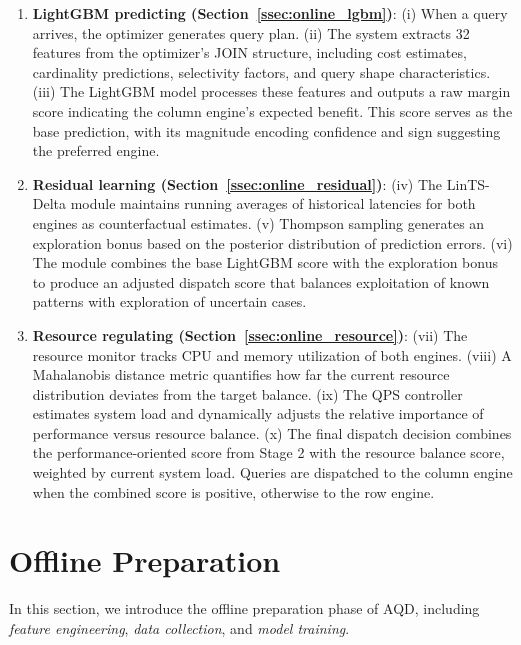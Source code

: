 \documentclass[sigconf, nonacm]{acmart}
\newcommand{\dispatcher}{AQD\xspace}
\begin{document}
\begin{enumerate}[leftmargin=*]
  \item \textbf{LightGBM predicting (Section~\ref{ssec:online_lgbm})}: 
        (i) When a query arrives, the optimizer generates query plan.
        (ii) The system extracts 32 features from the optimizer's JOIN structure, including cost estimates, cardinality predictions, selectivity factors, and query shape characteristics.
        (iii) The LightGBM model processes these features and outputs a raw margin score indicating the column engine's expected benefit. This score serves as the base prediction, with its magnitude encoding confidence and sign suggesting the preferred engine.

    \item \textbf{Residual learning (Section~\ref{ssec:online_residual})}:  
        (iv) The LinTS-Delta module maintains running averages of historical latencies for both engines as counterfactual estimates.
        (v) Thompson sampling generates an exploration bonus based on the posterior distribution of prediction errors.
        (vi) The module combines the base LightGBM score with the exploration bonus to produce an adjusted dispatch score that balances exploitation of known patterns with exploration of uncertain cases.
        

  \item \textbf{Resource regulating (Section~\ref{ssec:online_resource})}: 
    (vii) The resource monitor tracks CPU and memory utilization of both engines.
    (viii) A Mahalanobis distance metric quantifies how far the current resource distribution deviates from the target balance.
    (ix) The QPS controller estimates system load and dynamically adjusts the relative importance of performance versus resource balance.
    (x) The final dispatch decision combines the performance-oriented score from Stage 2 with the resource balance score, weighted by current system load. Queries are dispatched to the column engine when the combined score is positive, otherwise to the row engine.
\end{enumerate}


\vspace{-1em}

\section{Offline Preparation}\label{sec:offline}
In this section, we introduce the offline preparation phase of \dispatcher, including \emph{feature engineering}, \emph{data collection}, and \emph{model training}.
\end{document}
